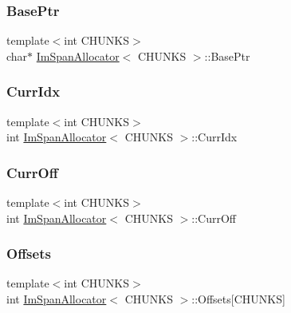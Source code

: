 \subsubsection{\texorpdfstring{Base\+Ptr}{BasePtr}}
{\footnotesize\ttfamily template$<$int C\+H\+U\+N\+KS$>$ \\
char$\ast$ \hyperlink{structImSpanAllocator}{Im\+Span\+Allocator}$<$ C\+H\+U\+N\+KS $>$\+::Base\+Ptr}

\mbox{\label{structImSpanAllocator_a5ef3ee2f2ba50bf7fe63c81decfa75e7}} 
\subsubsection{\texorpdfstring{Curr\+Idx}{CurrIdx}}
{\footnotesize\ttfamily template$<$int C\+H\+U\+N\+KS$>$ \\
int \hyperlink{structImSpanAllocator}{Im\+Span\+Allocator}$<$ C\+H\+U\+N\+KS $>$\+::Curr\+Idx}

\mbox{\label{structImSpanAllocator_aee84402fdab48c9a6a14994ae525d503}} 
\subsubsection{\texorpdfstring{Curr\+Off}{CurrOff}}
{\footnotesize\ttfamily template$<$int C\+H\+U\+N\+KS$>$ \\
int \hyperlink{structImSpanAllocator}{Im\+Span\+Allocator}$<$ C\+H\+U\+N\+KS $>$\+::Curr\+Off}

\mbox{\label{structImSpanAllocator_a480822668b44faa98ae0363765059c06}} 
\subsubsection{\texorpdfstring{Offsets}{Offsets}}
{\footnotesize\ttfamily template$<$int C\+H\+U\+N\+KS$>$ \\
int \hyperlink{structImSpanAllocator}{Im\+Span\+Allocator}$<$ C\+H\+U\+N\+KS $>$\+::Offsets\mbox{[}C\+H\+U\+N\+KS\mbox{]}}

